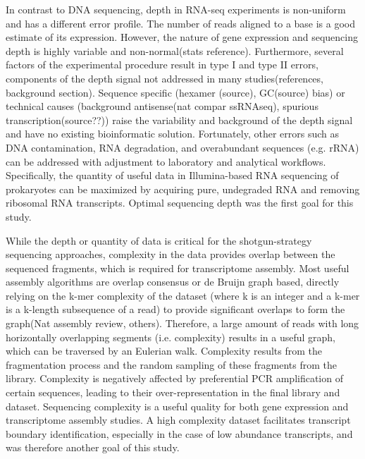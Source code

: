 In contrast to DNA sequencing, depth in RNA-seq experiments is non-uniform and has a different error profile. The number of reads aligned to a base is a good estimate of its expression. However, the nature of gene expression and sequencing depth is highly variable and non-normal(stats reference). Furthermore, several factors of the experimental procedure result in type I and type II errors, components of the depth signal not addressed in many studies(references, background section). Sequence specific (hexamer (source), GC(source) bias) or technical causes (background antisense(nat compar ssRNAseq), spurious transcription(source??)) raise the variability and background of the depth signal and have no existing bioinformatic solution. Fortunately, other errors such as DNA contamination, RNA degradation, and overabundant sequences (e.g. rRNA) can be addressed with adjustment to laboratory and analytical workflows. Specifically, the quantity of useful data in Illumina-based RNA sequencing of prokaryotes can be maximized by acquiring pure, undegraded RNA and removing ribosomal RNA transcripts. Optimal sequencing depth was the first goal for this study.

While the depth or quantity of data is critical for the shotgun-strategy sequencing approaches, complexity in the data provides overlap between the sequenced fragments, which is required for transcriptome assembly. Most useful assembly algorithms are overlap consensus or de Bruijn graph based, directly relying on the k-mer complexity of the dataset (where k is an integer and a k-mer is a k-length subsequence of a read) to provide significant overlaps to form the graph(Nat assembly review, others). Therefore, a large amount of reads with long horizontally overlapping segments (i.e. complexity) results in a useful graph, which can be traversed by an Eulerian walk. Complexity results from the fragmentation process and the random sampling of these fragments from the library. Complexity is negatively affected by preferential PCR amplification of certain sequences, leading to their over-representation in the final library and dataset. Sequencing complexity is a useful quality for both gene expression and transcriptome assembly studies. A high complexity dataset facilitates transcript boundary identification, especially in the case of low abundance transcripts, and was therefore another goal of this study.

